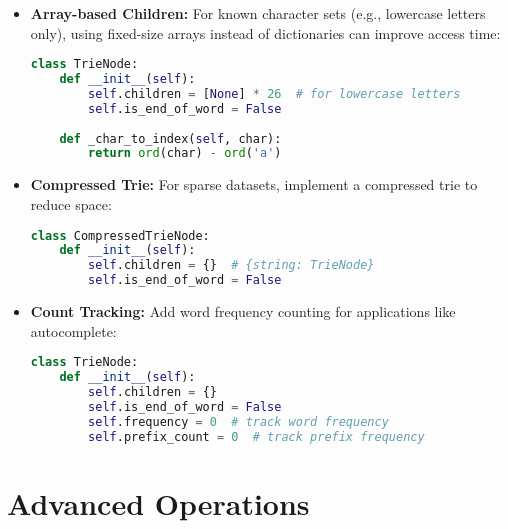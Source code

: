 \begin{itemize}
    \item \textbf{Array-based Children:} For known character sets (e.g., lowercase letters only), using fixed-size arrays instead of dictionaries can improve access time:
    \begin{lstlisting}[language=Python]
class TrieNode:
    def __init__(self):
        self.children = [None] * 26  # for lowercase letters
        self.is_end_of_word = False
        
    def _char_to_index(self, char):
        return ord(char) - ord('a')
    \end{lstlisting}

    \item \textbf{Compressed Trie:} For sparse datasets, implement a compressed trie to reduce space:
    \begin{lstlisting}[language=Python]
class CompressedTrieNode:
    def __init__(self):
        self.children = {}  # {string: TrieNode}
        self.is_end_of_word = False
    \end{lstlisting}

    \item \textbf{Count Tracking:} Add word frequency counting for applications like autocomplete:
    \begin{lstlisting}[language=Python]
class TrieNode:
    def __init__(self):
        self.children = {}
        self.is_end_of_word = False
        self.frequency = 0  # track word frequency
        self.prefix_count = 0  # track prefix frequency
    \end{lstlisting}
\end{itemize}

\section*{Advanced Operations}

